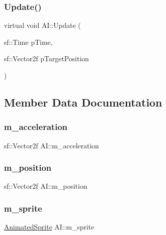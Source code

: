 \mbox{\label{class_a_i_a2e99f0dce9e1daa938ab4604dabb60f0}} 
\subsubsection{\texorpdfstring{Update()}{Update()}}
{\footnotesize\ttfamily virtual void A\+I\+::\+Update (\begin{DoxyParamCaption}\item[{sf\+::\+Time}]{p\+Time,  }\item[{sf\+::\+Vector2f}]{p\+Target\+Position }\end{DoxyParamCaption})\hspace{0.3cm}{\ttfamily [pure virtual]}}



\subsection{Member Data Documentation}
\mbox{\label{class_a_i_a2527c9a48210634111f73ed4695f31c8}} 
\subsubsection{\texorpdfstring{m\+\_\+acceleration}{m\_acceleration}}
{\footnotesize\ttfamily sf\+::\+Vector2f A\+I\+::m\+\_\+acceleration\hspace{0.3cm}{\ttfamily [protected]}}

\mbox{\label{class_a_i_a4bf027954217b1a88e7aeb154e569be8}} 
\subsubsection{\texorpdfstring{m\+\_\+position}{m\_position}}
{\footnotesize\ttfamily sf\+::\+Vector2f A\+I\+::m\+\_\+position\hspace{0.3cm}{\ttfamily [protected]}}

\mbox{\label{class_a_i_a1110fa8ed47f193fb4c035ea92ac39dc}} 
\subsubsection{\texorpdfstring{m\+\_\+sprite}{m\_sprite}}
{\footnotesize\ttfamily \hyperlink{class_animated_sprite}{Animated\+Sprite} A\+I\+::m\+\_\+sprite\hspace{0.3cm}{\ttfamily [protected]}}

